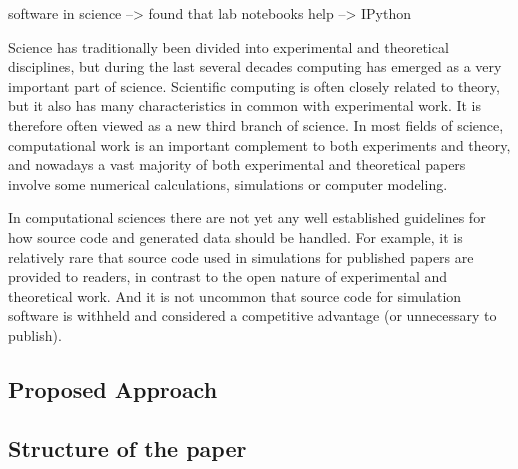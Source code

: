 software in science --> found that lab notebooks help --> IPython

Science has traditionally been divided into experimental and theoretical disciplines, but during the last
several decades computing has emerged as a very important part of science. Scientific computing is often
closely related to theory, but it also has many characteristics in common with experimental work. It is
therefore often viewed as a new third branch of science. In most fields of science, computational work is an
important complement to both experiments and theory, and nowadays a vast majority of both experimental
and theoretical papers involve some numerical calculations, simulations or computer modeling.

In computational sciences there are not yet any well established guidelines for how source code and
generated data should be handled. For example, it is relatively rare that source code used in simulations for
published papers are provided to readers, in contrast to the open nature of experimental and theoretical work.
And it is not uncommon that source code for simulation software is withheld and considered a competitive
advantage (or unnecessary to publish).\cite{johansson2014introduction}

\subsection{Proposed Approach}

\subsection{Structure of the paper}